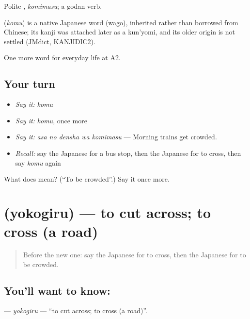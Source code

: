 Polite \textbf{}, \emph{komimasu}; a godan verb.

\begin{cousinweb}
\textbf{} (\emph{komu}) is a native Japanese word (wago), inherited rather than borrowed from Chinese; its kanji was attached later as a kun'yomi, and its older origin is not settled (JMdict, KANJIDIC2).
\end{cousinweb}

\begin{grammarlens}[title={What you've built}]
One more word for everyday life at A2.
\end{grammarlens}

\subsection*{Your turn}
\begin{itemize}
\raggedright
  \item \emph{Say it:} \emph{komu}
  \item \emph{Say it:} \emph{komu}, once more
  \item \emph{Say it:} \emph{asa no densha wa komimasu} — Morning trains get crowded.
  \item \emph{Recall:} say the Japanese for a bus stop, then the Japanese for to cross, then say \emph{komu} again
\end{itemize}

\begin{tcolorbox}[breakable,colback=teal!4,colframe=teal!35!black,title={Before you move on}]
What does  mean? (\textquotedblleft{}To be crowded\textquotedblright{}.) Say it once more.
\end{tcolorbox}
\section[\texorpdfstring{\ja{よこぎる} (yokogiru)}{よこぎる (yokogiru)}]{ (yokogiru) — to cut across; to cross (a road)}

\label{lesson:JA-C201-yokogiru}



\begin{quote}
Before the new one: say the Japanese for to cross, then the Japanese for to be crowded.
\end{quote}

\subsection*{You'll want to know: }
\textbf{} — \emph{yokogiru} — \textquotedblleft{}to cut across; to cross (a road)\textquotedblright{}.

